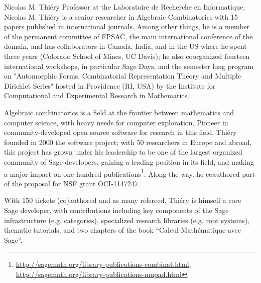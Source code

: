 \begin{picv}[PM=12,salary=7500]{Nicolas M. Thiéry}
  Professor at the Laboratoire de Recherche en Informatique, Nicolas M. Thiéry is a senior
  researcher in Algebraic Combinatorics with 15 papers published in international
  journals. Among other things, he is a member of the permanent committee of FPSAC, the
  main international conference of the domain, and has collaborators in Canada, India, and
  in the US where he spent three years (Colorado School of Mines, UC Davis); he also
  coorganized fourteen international workshops, in particular Sage Days, and the semester
  long program on "Automorphic Forms, Combinatorial Representation Theory and Multiple
  Dirichlet Series" hosted in Providence (RI, USA) by the Institute for Computational and
  Experimental Research in Mathematics.

  Algebraic combinatorics is a field at the frontier between mathematics and computer
  science, with heavy needs for computer exploration. Pioneer in community-developed open
  source software for research in this field, Thiéry founded in 2000 the \SageCombinat
  software project; with 50 researchers in Europe and abroad, this project has grown under
  his leadership to be one of the largest organized community of Sage developers, gaining
  a leading position in its field, and making a major impact on one hundred
  publications\footnote{\url{http://sagemath.org/library-publications-combinat.html},
    \url{http://sagemath.org/library-publications-mupad.html}}. Along the way,
  he coauthored part of the proposal for NSF \SageCombinat grant OCI-1147247.

  With 150 tickets (co)authored and as many refereed, Thiéry is himself a core Sage
  developer, with contributions including key components of the Sage infrastructure
  (e.g. categories), specialized research libraries (e.g. root systems), thematic
  tutorials, and two chapters of the book ``Calcul Mathématique avec Sage''.
\end{picv}
